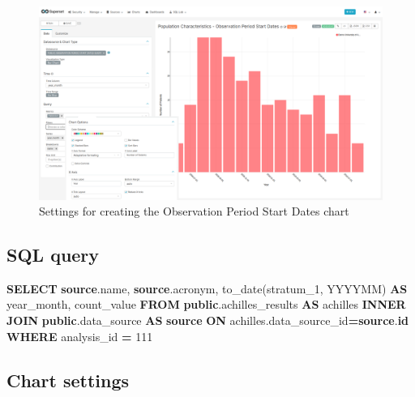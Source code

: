 \documentclass[
]{book}
\newenvironment{Shaded}{\begin{snugshade}}{\end{snugshade}}
\newcommand{\DecValTok}[1]{\textcolor[rgb]{0.00,0.00,0.81}{#1}}
\newcommand{\FunctionTok}[1]{\textcolor[rgb]{0.00,0.00,0.00}{#1}}
\newcommand{\KeywordTok}[1]{\textcolor[rgb]{0.13,0.29,0.53}{\textbf{#1}}}
\newcommand{\NormalTok}[1]{#1}
\newcommand{\OperatorTok}[1]{\textcolor[rgb]{0.81,0.36,0.00}{\textbf{#1}}}
\newcommand{\StringTok}[1]{\textcolor[rgb]{0.31,0.60,0.02}{#1}}
\begin{document}
\begin{figure}
\includegraphics[width=1\linewidth]{images/05-observation_period/03-observation_period_start_dates} \caption{Settings for creating the Observation Period Start Dates chart}\label{fig:observationPeriodStartDates}
\end{figure}

\hypertarget{sql-query-14}{%
\subsection{SQL query}\label{sql-query-14}}

\begin{Shaded}
\begin{Highlighting}[]
\KeywordTok{SELECT} \KeywordTok{source}\NormalTok{.name,}
       \KeywordTok{source}\NormalTok{.acronym,}
       \FunctionTok{to\_date}\NormalTok{(stratum\_1, }\StringTok{\textquotesingle{}YYYYMM\textquotesingle{}}\NormalTok{) }\KeywordTok{AS}\NormalTok{ year\_month,}
\NormalTok{       count\_value}
\KeywordTok{FROM} \KeywordTok{public}\NormalTok{.achilles\_results }\KeywordTok{AS}\NormalTok{ achilles}
\KeywordTok{INNER} \KeywordTok{JOIN} \KeywordTok{public}\NormalTok{.data\_source }\KeywordTok{AS} \KeywordTok{source} \KeywordTok{ON}\NormalTok{ achilles.data\_source\_id}\OperatorTok{=}\KeywordTok{source}\NormalTok{.}\KeywordTok{id}
\KeywordTok{WHERE}\NormalTok{ analysis\_id }\OperatorTok{=} \DecValTok{111}
\end{Highlighting}
\end{Shaded}

\hypertarget{chart-settings-14}{%
\subsection{Chart settings}\label{chart-settings-14}}
\end{document}

